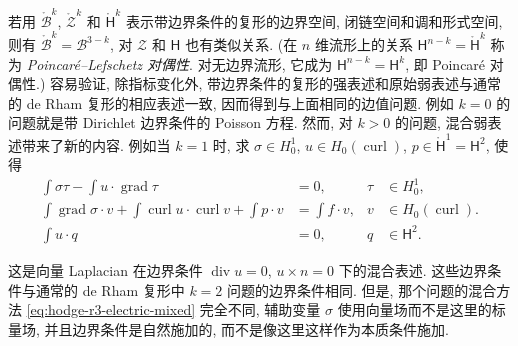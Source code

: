 若用 $\mathring{\mathcal B}^k$, $\mathring{\mathcal Z}^k$ 和 $\mathring{\mathsf H}^k$ 表示带边界条件的复形的边界空间, 闭链空间和调和形式空间, 则有 $\mathring{\mathcal B}^k=\mathcal B^{3-k}$, 对 $\mathcal Z$ 和 $\mathsf H$ 也有类似关系. (在 $n$ 维流形上的关系 $\mathsf H^{n-k}=\mathring{\mathsf H}^k$ 称为 \emph{Poincaré–Lefschetz 对偶性}. 对无边界流形, 它成为 $\mathsf H^{n-k}=\mathsf H^k$, 即 Poincaré 对偶性.) 容易验证, 除指标变化外, 带边界条件的复形的强表述和原始弱表述与通常的 de Rham 复形的相应表述一致, 因而得到与上面相同的边值问题. 例如 $k=0$ 的问题就是带 Dirichlet 边界条件的 Poisson 方程. 然而, 对 $k>0$ 的问题, 混合弱表述带来了新的内容. 例如当 $k=1$ 时, 求 $\sigma\in H_{0}^1$, $u\in H_{0}(\operatorname{curl})$, $p\in\mathring{\mathsf H}^1=\mathsf H^2$, 使得
\[
\begin{aligned}
\int\sigma\tau-\int u\cdot\operatorname{grad}\tau&=0,&\tau&\in H_{0}^1,\\
\int\operatorname{grad}\sigma\cdot v+\int\operatorname{curl}u\cdot\operatorname{curl}v+\int p\cdot v&=\int f\cdot v,&v&\in H_{0}(\operatorname{curl}).\\
\int u\cdot q&=0,&q&\in\mathsf H^2.
\end{aligned}
\]

这是向量 Laplacian 在边界条件 $\operatorname{div}u=0$, $u\times n=0$ 下的混合表述. 这些边界条件与通常的 de Rham 复形中 $k=2$ 问题的边界条件相同. 但是, 那个问题的混合方法 \eqref{eq:hodge-r3-electric-mixed} 完全不同, 辅助变量 $\sigma$ 使用向量场而不是这里的标量场, 并且边界条件是自然施加的, 而不是像这里这样作为本质条件施加.


